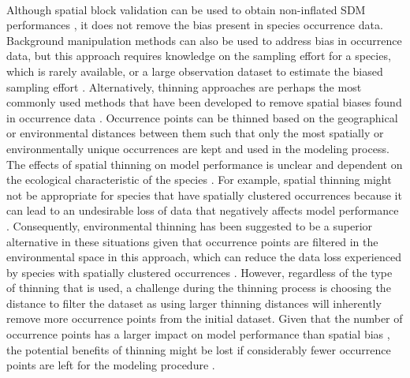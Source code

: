 \paragraph*{}
Although spatial block validation can be used to obtain non-inflated SDM performances \parencite{bahn2013,radosavljevic2014, roberts2017}, it does not remove the bias present in species occurrence data. Background manipulation methods can also be used to address bias in occurrence data, but this approach requires knowledge on the sampling effort for a species, which is rarely available, or a large observation dataset to estimate the biased sampling effort \parencite{phillips2009, ranc2017, inman2021}. Alternatively, thinning approaches are perhaps the most commonly used methods that have been developed to remove spatial biases found in occurrence data \parencite{hidalgo2004,veloz2009,anderson2010,varela2014,aiello2015}. Occurrence points can be thinned based on the geographical \parencite{veloz2009,aiello2015} or environmental \parencite{varela2014} distances between them such that only the most spatially or environmentally unique occurrences are kept and used in the modeling process. The effects of spatial thinning on model performance is unclear \parencite{boria2014, beck2014, varela2014, castellanos2019} and dependent on the ecological characteristic of the species \parencite{steen2021,baker2022}. For example, spatial thinning might not be appropriate for species that have spatially clustered occurrences because it can lead to an undesirable loss of data that negatively affects model performance \parencite{varela2014}. Consequently, environmental thinning has been suggested to be a superior alternative in these situations given that occurrence points are filtered in the environmental space in this approach, which can reduce the data loss experienced by species with spatially clustered occurrences \parencite{varela2014, castellanos2019}. However, regardless of the type of thinning that is used, a challenge during the thinning process is choosing the distance to filter the dataset \parencite{castellanos2019} as using larger thinning distances will inherently remove more occurrence points from the initial dataset. Given that the number of occurrence points has a larger impact on model performance than spatial bias \parencite{gaul2020}, the potential benefits of thinning might be lost if considerably fewer occurrence points are left for the modeling procedure \parencite{steen2021}.




